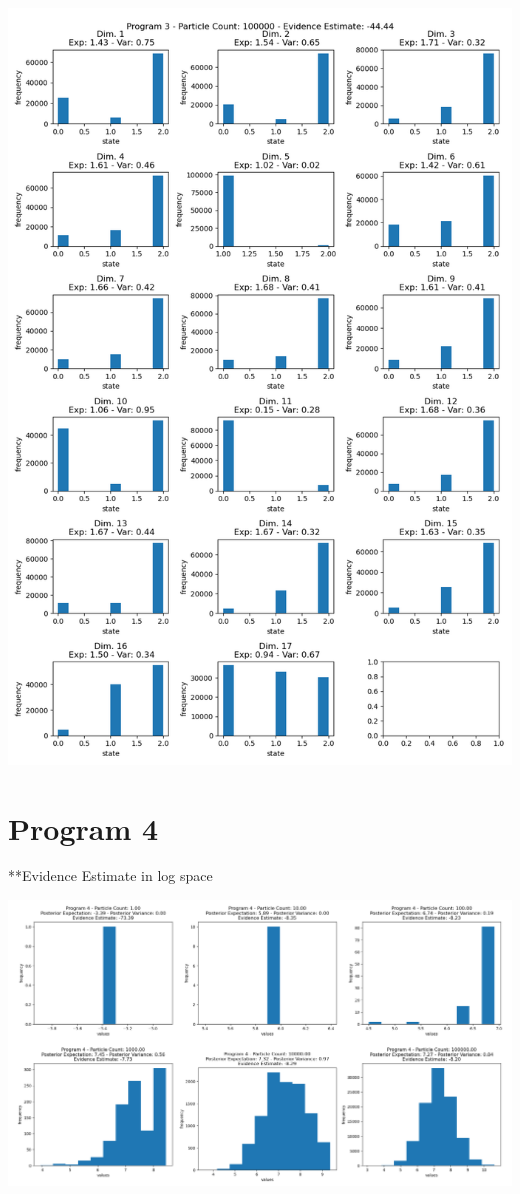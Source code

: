 \documentclass[10pt]{homeworg}
\begin{document}
\begin{center}
\includegraphics[scale=0.5]{figures/program3/100000_particles.png}
\end{center}

\newpage

\section*{Program 4}
\small{**Evidence Estimate in log space}
\begin{center}
\hspace*{-2cm}
\includegraphics[scale=0.5]{figures/program4/program4.png}
\end{center}
\end{document}
